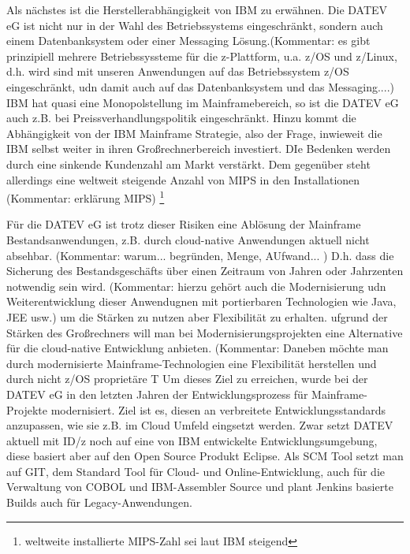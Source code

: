 Als nächstes ist die Herstellerabhängigkeit von IBM zu erwähnen.
Die DATEV eG ist nicht nur in der Wahl des Betriebssystems eingeschränkt, sondern auch einem Datenbanksystem oder einer Messaging Lösung.(Kommentar: es gibt prinzipiell mehrere Betriebssyssteme für die z-Plattform, u.a. z/OS und z/Linux, d.h. wird sind mit unseren Anwendungen auf das Betriebssystem z/OS eingeschränkt, udn damit auch auf das Datenbanksystem und das Messaging....)
IBM hat  quasi eine Monopolstellung\cite{fehlt noch} im Mainframebereich, so ist die DATEV eG auch z.B. bei Preissverhandlungspolitik eingeschränkt.
Hinzu kommt die Abhängigkeit von der IBM Mainframe Strategie, also der Frage, inwieweit die IBM selbst weiter in ihren Großrechnerbereich investiert.
DIe Bedenken werden durch eine sinkende Kundenzahl am Markt verstärkt. Dem gegenüber steht allerdings eine weltweit steigende Anzahl von MIPS in den Installationen (Kommentar: erklärung MIPS) \footnote{weltweite installierte MIPS-Zahl sei laut IBM steigend}

Für die DATEV eG ist trotz dieser Risiken eine Ablösung der Mainframe Bestandsanwendungen, z.B. durch cloud-native Anwendungen aktuell nicht absehbar. (Kommentar: warum... begründen, Menge, AUfwand... )
D.h. dass die Sicherung des Bestandsgeschäfts über einen Zeitraum von Jahren oder Jahrzenten notwendig sein wird. 
(Kommentar: hierzu gehört auch die Modernisierung udn Weiterentwicklung dieser Anwendugnen mit portierbaren Technologien wie Java, JEE usw.) um die Stärken zu nutzen aber Flexibilität zu erhalten.
ufgrund der Stärken des Großrechners will man bei Modernisierungsprojekten eine Alternative für die cloud-native Entwicklung anbieten.
(Kommentar: Daneben möchte man durch modernisierte Mainframe-Technologien eine Flexibilität herstellen und durch nicht z/OS proprietäre T
Um dieses Ziel zu erreichen, wurde bei der DATEV eG in den letzten Jahren der Entwicklungsprozess für Mainframe-Projekte modernisiert.
Ziel ist es, diesen an verbreitete Entwicklungsstandards anzupassen, wie sie z.B. im Cloud Umfeld eingsetzt werden. 
Zwar setzt DATEV aktuell mit ID/z noch auf eine von IBM entwickelte Entwicklungsumgebung, diese basiert aber auf den Open Source Produkt Eclipse. Als SCM Tool setzt man auf GIT, dem Standard Tool für Cloud- und Online-Entwicklung, auch für die Verwaltung von COBOL und IBM-Assembler Source und plant Jenkins basierte Builds auch für Legacy-Anwendungen.

